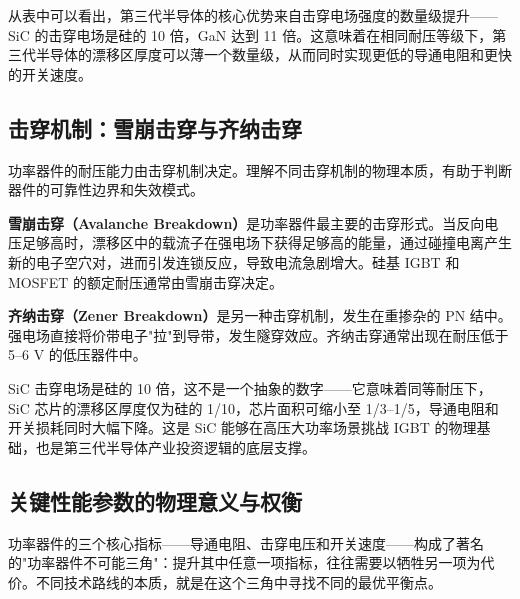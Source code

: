 从表中可以看出，第三代半导体的核心优势来自击穿电场强度的数量级提升——SiC 的击穿电场是硅的 10 倍，GaN 达到 11 倍。这意味着在相同耐压等级下，第三代半导体的漂移区厚度可以薄一个数量级，从而同时实现更低的导通电阻和更快的开关速度。

\subsection{击穿机制：雪崩击穿与齐纳击穿}

功率器件的耐压能力由击穿机制决定。理解不同击穿机制的物理本质，有助于判断器件的可靠性边界和失效模式。

\textbf{雪崩击穿（Avalanche Breakdown）}是功率器件最主要的击穿形式。当反向电压足够高时，漂移区中的载流子在强电场下获得足够高的能量，通过碰撞电离产生新的电子空穴对，进而引发连锁反应，导致电流急剧增大。硅基 IGBT 和 MOSFET 的额定耐压通常由雪崩击穿决定。

\textbf{齐纳击穿（Zener Breakdown）}是另一种击穿机制，发生在重掺杂的 PN 结中。强电场直接将价带电子"拉"到导带，发生隧穿效应。齐纳击穿通常出现在耐压低于 5–6 V 的低压器件中。

\begin{keyinsight}
SiC 击穿电场是硅的 10 倍，这不是一个抽象的数字——它意味着同等耐压下，SiC 芯片的漂移区厚度仅为硅的 1/10，芯片面积可缩小至 1/3–1/5，导通电阻和开关损耗同时大幅下降。这是 SiC 能够在高压大功率场景挑战 IGBT 的物理基础，也是第三代半导体产业投资逻辑的底层支撑。
\end{keyinsight}

\subsection{关键性能参数的物理意义与权衡}

功率器件的三个核心指标——导通电阻、击穿电压和开关速度——构成了著名的"功率器件不可能三角"：提升其中任意一项指标，往往需要以牺牲另一项为代价。不同技术路线的本质，就是在这个三角中寻找不同的最优平衡点。

